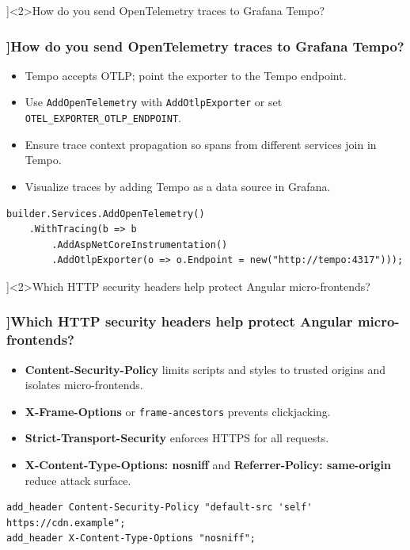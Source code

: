 \QuestionSlide[\CategoryBadge[AuthColor!20]{Cloud}]<2>{How do you send OpenTelemetry traces to Grafana Tempo?}
\begin{frame}[fragile]
  \frametitle{\AnswerTitle[\CategoryBadge[AuthColor!20]{Cloud}]{How do you send OpenTelemetry traces to Grafana Tempo?}}

  {\footnotesize
  \begin{itemize}
    \item Tempo accepts OTLP; point the exporter to the Tempo endpoint.
    \item Use \texttt{AddOpenTelemetry} with \texttt{AddOtlpExporter} or set \texttt{OTEL\_EXPORTER\_OTLP\_ENDPOINT}.
    \item Ensure trace context propagation so spans from different services join in Tempo.
    \item Visualize traces by adding Tempo as a data source in Grafana.
  \end{itemize}
  }

  \begin{verbatim}
builder.Services.AddOpenTelemetry()
    .WithTracing(b => b
        .AddAspNetCoreInstrumentation()
        .AddOtlpExporter(o => o.Endpoint = new("http://tempo:4317")));
  \end{verbatim}
\end{frame}

\QuestionSlide[\CategoryBadge[AuthColor!20]{Cloud}]<2>{Which HTTP security headers help protect Angular micro-frontends?}
\begin{frame}[fragile]
  \frametitle{\AnswerTitle[\CategoryBadge[AuthColor!20]{Cloud}]{Which HTTP security headers help protect Angular micro-frontends?}}

  {\footnotesize
  \begin{itemize}
    \item \textbf{Content-Security-Policy} limits scripts and styles to trusted origins and isolates micro-frontends.
    \item \textbf{X-Frame-Options} or \texttt{frame-ancestors} prevents clickjacking.
    \item \textbf{Strict-Transport-Security} enforces HTTPS for all requests.
    \item \textbf{X-Content-Type-Options: nosniff} and \textbf{Referrer-Policy: same-origin} reduce attack surface.
  \end{itemize}
  }

  \begin{verbatim}
add_header Content-Security-Policy "default-src 'self' https://cdn.example";
add_header X-Content-Type-Options "nosniff";
  \end{verbatim}
\end{frame}

